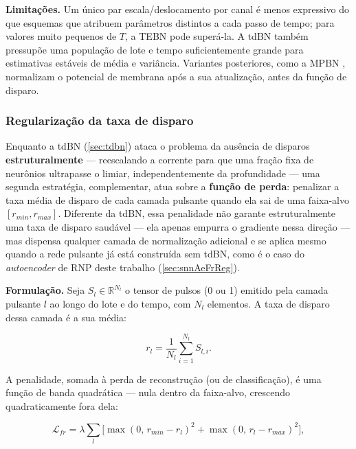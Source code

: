				\par \textbf{Limitações.} Um único par escala/deslocamento por canal é menos expressivo do que esquemas que atribuem parâmetros distintos a cada passo de tempo; para valores muito pequenos de $T$, a TEBN \cite{duan2022tebn} pode superá-la. A tdBN também pressupõe uma população de lote e tempo suficientemente grande para estimativas estáveis de média e variância. Variantes posteriores, como a MPBN \cite{guo2023mpbn}, normalizam o potencial de membrana após a sua atualização, antes da função de disparo.

			\subsubsection{Regularização da taxa de disparo}
				\label{sec:frReg}

				\par Enquanto a tdBN (\autoref{sec:tdbn}) ataca o problema da ausência de disparos \textbf{estruturalmente} --- reescalando a corrente para que uma fração fixa de neurônios ultrapasse o limiar, independentemente da profundidade --- uma segunda estratégia, complementar, atua sobre a \textbf{função de perda}: penalizar a taxa média de disparo de cada camada pulsante quando ela sai de uma faixa-alvo $[r_{min}, r_{max}]$. Diferente da tdBN, essa penalidade não garante estruturalmente uma taxa de disparo saudável --- ela apenas empurra o gradiente nessa direção --- mas dispensa qualquer camada de normalização adicional e se aplica mesmo quando a rede pulsante já está construída sem tdBN, como é o caso do \textit{autoencoder} de RNP deste trabalho (\autoref{sec:snnAeFrReg}).

				\par \textbf{Formulação.} Seja $S_l \in \mathbb{R}^{N_l}$ o tensor de pulsos (0 ou 1) emitido pela camada pulsante $l$ ao longo do lote e do tempo, com $N_l$ elementos. A taxa de disparo dessa camada é a sua média:

				\begin{equation}
					\label{eq:frrate}
					r_l = \frac{1}{N_l}\sum_{i=1}^{N_l} S_{l,i}.
				\end{equation}

				\par A penalidade, somada à perda de reconstrução (ou de classificação), é uma função de banda quadrática --- nula dentro da faixa-alvo, crescendo quadraticamente fora dela:

				\begin{equation}
					\label{eq:frreg}
					\mathcal{L}_{fr} = \lambda \sum_{l} \Big[\max(0,\, r_{min} - r_l)^2 + \max(0,\, r_l - r_{max})^2\Big],
				\end{equation}

